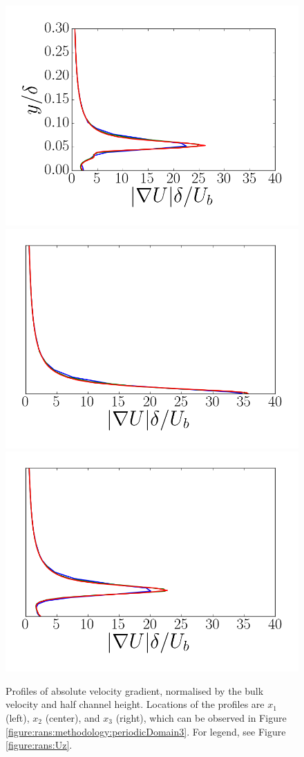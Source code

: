\documentclass[12pt,oneside,a4paper]{article}
\begin{document}
\begin{figure}
\centering
\includegraphics[width=0.33\linewidth]{images/CFD_meshIndependence/X1_gradU.png}\hfill \includegraphics[width=0.33\linewidth]{images/CFD_meshIndependence/X2_gradU.png}\hfill
\includegraphics[width=0.33\linewidth]{images/CFD_meshIndependence/X3_gradU.png}\hfill
\caption{Profiles of absolute velocity gradient, normalised by the bulk velocity and half channel height. Locations of the profiles are $x_1$ (left), $x_2$ (center), and $x_3$ (right), which can be observed in Figure \ref{figure:rans:methodology:periodicDomain3}. For legend, see Figure \ref{figure:rans:Uz}.}
\label{figure:rans:gradU}
\end{figure}
\end{document}
